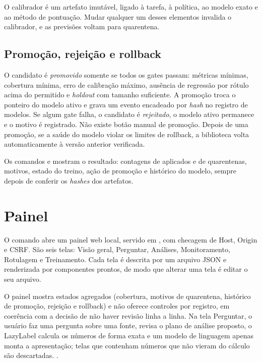O calibrador é um artefato imutável, ligado à tarefa, à política, ao modelo exato e ao método de pontuação. Mudar qualquer um desses elementos invalida o calibrador, e as previsões voltam para quarentena.

\subsection{Promoção, rejeição e rollback}

O candidato é \emph{promovido} somente se todos os gates passam: métricas mínimas, cobertura mínima, erro de calibração máximo, ausência de regressão por rótulo acima do permitido e \emph{holdout} com tamanho suficiente. A promoção troca o ponteiro do modelo ativo e grava um evento encadeado por \emph{hash} no registro de modelos. Se algum gate falha, o candidato é \emph{rejeitado}, o modelo ativo permanece e o motivo é registrado. Não existe botão manual de promoção. Depois de uma promoção, se a saúde do modelo violar os limites de rollback, a biblioteca volta automaticamente à versão anterior verificada.

Os comandos  e  mostram o resultado: contagens de aplicados e de quarentenas, motivos, estado do treino, ação de promoção e histórico do modelo, sempre depois de conferir os \emph{hashes} dos artefatos.

\section{Painel}

O comando  abre um painel web local, servido em , com checagem de Host, Origin e CSRF. São seis telas: Visão geral, Perguntar, Análises, Monitoramento, Rotulagem e Treinamento. Cada tela é descrita por um arquivo JSON e renderizada por componentes prontos, de modo que alterar uma tela é editar o seu arquivo.

O painel mostra estados agregados (cobertura, motivos de quarentena, histórico de promoção, rejeição e rollback) e não oferece controles por registro, em coerência com a decisão de não haver revisão linha a linha. Na tela Perguntar, o usuário faz uma pergunta sobre uma fonte, revisa o plano de análise proposto, o LazyLabel calcula os números de forma exata e um modelo de linguagem apenas monta a apresentação; telas que contenham números que não vieram do cálculo são descartadas. .

